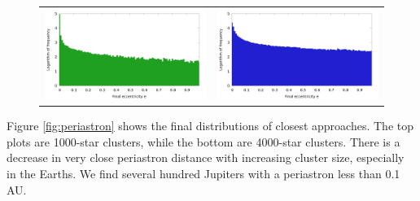 \documentclass[12pt]{article}
\begin{document}
\begin{figure}[H]
\begin{tabular}{cc}
            \includegraphics[width=3.25in]{eccentricity_earth_4000} &
            \includegraphics[width=3.25in]{eccentricity_jupiter_4000}
        \end{tabular}
    \end{figure}

    Figure \ref{fig:periastron} shows the final distributions of closest approaches.
    The top plots are 1000-star clusters, while the bottom are 4000-star clusters.
    There is a decrease in very close periastron distance with increasing cluster size,
    especially in the Earths. We find several hundred Jupiters with a periastron less than
    0.1 AU.

\end{document}
